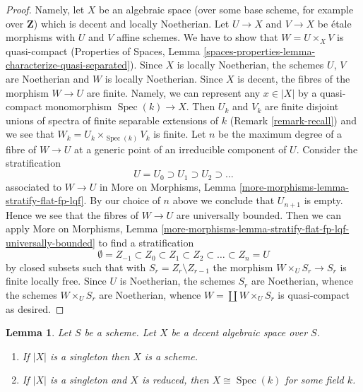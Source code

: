 \documentclass{stacks-project}
\theoremstyle{plain}
\newtheorem{lemma}[subsection]{Lemma}
\theoremstyle{definition}
\theoremstyle{remark}
\numberwithin{equation}{subsection}
\def\Spec{\mathop{\mathrm{Spec}}}
\begin{document}
\begin{proof}
Namely, let $X$ be an algebraic space (over some base scheme, for
example over $\mathbf{Z}$) which is decent and locally Noetherian.
Let $U \to X$ and $V \to X$ be \'etale morphisms with $U$ and $V$
affine schemes. We have to show that $W = U \times_X V$ is quasi-compact
(Properties of Spaces, Lemma
\ref{spaces-properties-lemma-characterize-quasi-separated}).
Since $X$ is locally Noetherian, the schemes $U$, $V$ are Noetherian
and $W$ is locally Noetherian. Since $X$ is decent, the fibres
of the morphism $W \to U$ are finite. Namely, we can represent
any $x \in |X|$ by a quasi-compact monomorphism $\Spec(k) \to X$.
Then $U_k$ and $V_k$ are finite disjoint unions of spectra of
finite separable extensions of $k$ (Remark \ref{remark-recall})
and we see that $W_k = U_k \times_{\Spec(k)} V_k$ is finite.
Let $n$ be the maximum degree of a fibre of $W \to U$ at a generic
point of an irreducible component of $U$. Consider the stratification
$$
U = U_0 \supset U_1 \supset U_2 \supset \ldots
$$
associated to $W \to U$ in
More on Morphisms, Lemma \ref{more-morphisms-lemma-stratify-flat-fp-lqf}.
By our choice of $n$ above we conclude that $U_{n + 1}$ is empty.
Hence we see that the fibres of $W \to U$ are universally bounded.
Then we can apply More on Morphisms, Lemma
\ref{more-morphisms-lemma-stratify-flat-fp-lqf-universally-bounded}
to find a stratification
$$
\emptyset = Z_{-1} \subset Z_0 \subset Z_1 \subset Z_2 \subset
\ldots \subset Z_n = U
$$
by closed subsets such that with $S_r = Z_r \setminus Z_{r - 1}$
the morphism $W \times_U S_r \to S_r$ is finite locally free.
Since $U$ is Noetherian, the schemes $S_r$ are Noetherian,
whence the schemes $W \times_U S_r$ are Noetherian, whence
$W = \coprod W \times_U S_r$ is quasi-compact as desired.
\end{proof}

\begin{lemma}
\label{lemma-when-field}
Let $S$ be a scheme. Let $X$ be a decent algebraic space over $S$.
\begin{enumerate}
\item If $|X|$ is a singleton then $X$ is a scheme.
\item If $|X|$ is a singleton and $X$ is reduced, then
$X \cong \Spec(k)$ for some field $k$.
\end{enumerate}
\end{lemma}
\end{document}
